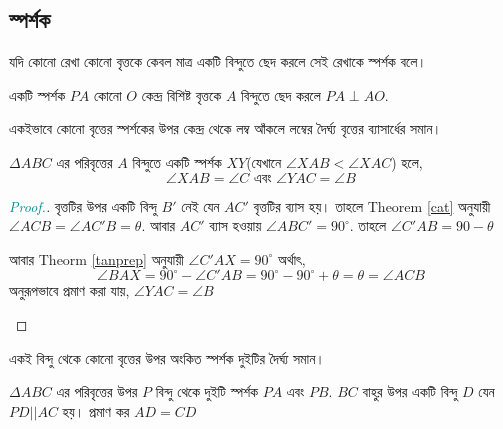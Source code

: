 \documentclass[a4paper,11pt]{article}
\newcommand{\drg}{^{\circ}}
\newenvironment{prf}{\begin{proof}[\emph{\textcolor{darkcyan}{Proof.}}]} {\end{proof}}
\begin{document}
\subsection{স্পর্শক}
যদি কোনো রেখা কোনো বৃত্তকে কেবল মাত্র একটি বিন্দুতে ছেদ করলে সেই রেখাকে স্পর্শক বলে। 
\begin{thrm}
	\label{tanperp}
	একটি স্পর্শক $PA$ কোনো $O$ কেন্দ্র বিশিষ্ট বৃত্তকে $A$ বিন্দুতে ছেদ করলে $PA \perp AO$.
\end{thrm}
একইভাবে কোনো বৃত্তের স্পর্শকের উপর কেন্দ্র থেকে লম্ব আঁকলে লম্বের দৈর্ঘ্য বৃত্তের ব্যাসার্ধের সমান। 
\begin{thrm}
	\label{altseg}
	$\Delta ABC$ এর পরিবৃত্তের $A$ বিন্দুতে একটি স্পর্শক $XY$(যেখানে $\angle XAB<\angle XAC$) হলে,
	\[\angle XAB=\angle C \text{ এবং } \angle YAC=\angle B\]
\end{thrm}
\begin{prf} বৃত্তটির উপর একটি বিন্দু $B'$ নেই যেন $AC'$ বৃত্তটির ব্যাস হয়। তাহলে Theorem \ref{cat} অনুযায়ী $\angle ACB=\angle AC'B=\theta$. আবার $AC'$ ব্যাস হওয়ায় $\angle ABC'=90\drg$. তাহলে $\angle C'AB=90-\theta$
	
	আবার Theorm \ref{tanprep} অনুযায়ী $\angle C'AX=90\drg$ অর্থাৎ, 
	\[\angle BAX=90\drg-\angle C'AB=90\drg-90\drg+\theta =\theta=\angle ACB\]
	অনুরূপভাবে প্রমাণ করা যায়, $\angle YAC=\angle B$
	\begin{center}
	\end{center}
\end{prf}
\begin{col}
	একই বিন্দু থেকে কোনো বৃত্তের উপর অংকিত স্পর্শক দুইটির দৈর্ঘ্য সমান। 
\end{col}
\begin{xmpl}
	$\Delta ABC$ এর পরিবৃত্তের উপর $P$ বিন্দু থেকে দুইটি স্পর্শক $PA$ এবং $PB$. $BC$ বাহুর উপর একটি বিন্দু $D$ যেন $PD||AC$ হয়। প্রমাণ কর $AD=CD$
\end{xmpl}
\end{document}
